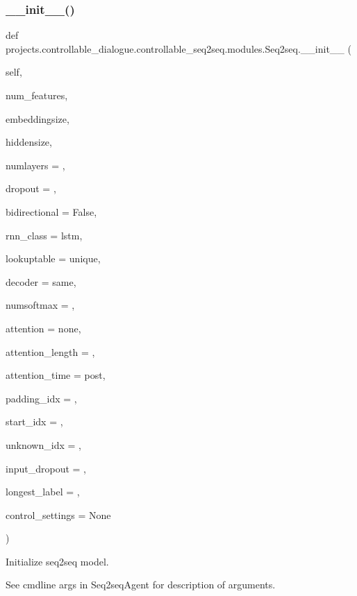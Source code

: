 \subsubsection{\texorpdfstring{\+\_\+\+\_\+init\+\_\+\+\_\+()}{\_\_init\_\_()}}
{\footnotesize\ttfamily def projects.\+controllable\+\_\+dialogue.\+controllable\+\_\+seq2seq.\+modules.\+Seq2seq.\+\_\+\+\_\+init\+\_\+\+\_\+ (\begin{DoxyParamCaption}\item[{}]{self,  }\item[{}]{num\+\_\+features,  }\item[{}]{embeddingsize,  }\item[{}]{hiddensize,  }\item[{}]{numlayers = {},  }\item[{}]{dropout = {},  }\item[{}]{bidirectional = {\ttfamily False},  }\item[{}]{rnn\+\_\+class = {\ttfamily \textquotesingle{}lstm\textquotesingle{}},  }\item[{}]{lookuptable = {\ttfamily \textquotesingle{}unique\textquotesingle{}},  }\item[{}]{decoder = {\ttfamily \textquotesingle{}same\textquotesingle{}},  }\item[{}]{numsoftmax = {},  }\item[{}]{attention = {\ttfamily \textquotesingle{}none\textquotesingle{}},  }\item[{}]{attention\+\_\+length = {},  }\item[{}]{attention\+\_\+time = {\ttfamily \textquotesingle{}post\textquotesingle{}},  }\item[{}]{padding\+\_\+idx = {},  }\item[{}]{start\+\_\+idx = {},  }\item[{}]{unknown\+\_\+idx = {},  }\item[{}]{input\+\_\+dropout = {},  }\item[{}]{longest\+\_\+label = {},  }\item[{}]{control\+\_\+settings = {\ttfamily None} }\end{DoxyParamCaption})}

\begin{DoxyVerb}Initialize seq2seq model.

See cmdline args in Seq2seqAgent for description of arguments.
\end{DoxyVerb}
 

